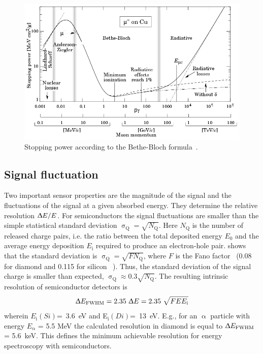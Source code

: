 \begin{figure}[!t]
\begin{center}
\includegraphics[width=0.7\linewidth]{02_pulse_formation/pics/bb2}
\caption{Stopping power according to the Bethe-Bloch formula~\cite{BETHE:00001}.}
\label{fig:bb2}
\end{center}
\end{figure}

\subsection{Signal fluctuation}
Two important sensor properties are the magnitude of the signal and the fluctuations of the signal at a given absorbed energy. They determine the relative resolution $\Updelta E/E$. For semiconductors the signal fluctuations are smaller than the simple statistical standard deviation $\upsigma_\mathrm{Q}=\sqrt{N_\mathrm{Q}}$. Here $N_\mathrm{Q}$ is the number of released charge pairs, i.e. the ratio between the total deposited energy $E_\mathrm{0}$ and the average energy deposition $E_\mathrm{i}$ required to produce an electron-hole pair. \cite{1947PhRv...72...26F} shows that the standard deviation is $\upsigma_\mathrm{Q}=\sqrt{F N_\mathrm{Q}}$, where $F$ is the Fano factor~\cite{1947PhRv...72...26F} (0.08 for diamond and 0.115 for silicon ~\cite{1980PhRvB..22.5565A}). Thus, the standard deviation of the signal charge is smaller than expected, $\upsigma_\mathrm{Q}\approx0.3 \sqrt{N_\mathrm{Q}}$. The resulting intrinsic resolution of semiconductor detectors is 
\begin{equation}
\label{eq:efwhm}
\Updelta E_\mathrm{FWHM} = 2.35~\Updelta E = 2.35~\sqrt{FEE_\mathrm{i}} 
\end{equation} 
wherein $E_\mathrm{i}(Si)$=~3.6~eV and E$_\mathrm{i}(Di)$=~13~eV. E.g., for an $\upalpha$ particle with energy $E_\upalpha$ = 5.5 MeV the calculated resolution in diamond is equal to $\Updelta E_{\mathrm{FWHM}}$ = 5.6~keV. This defines the minimum achievable resolution for energy spectroscopy with semiconductors. 
%


